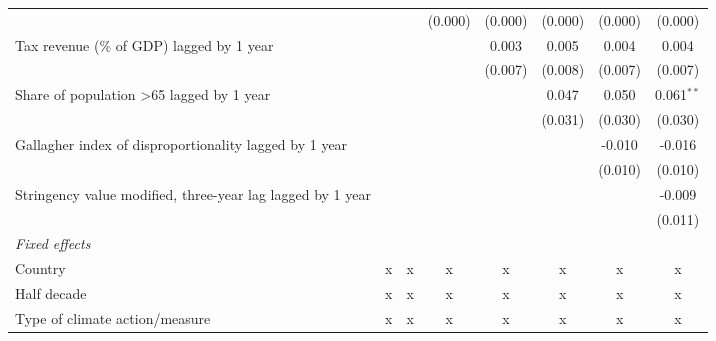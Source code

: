 \begin{tabular}{lccccccc}
                                                                            &               &               & (0.000)       & (0.000)       & (0.000)       & (0.000)       & (0.000)\\   
   Tax revenue (\% of GDP) lagged by 1 year                                 &               &               &               & 0.003         & 0.005         & 0.004         & 0.004\\   
                                                                            &               &               &               & (0.007)       & (0.008)       & (0.007)       & (0.007)\\   
   Share of population >65 lagged by 1 year                                 &               &               &               &               & 0.047         & 0.050         & 0.061$^{**}$\\   
                                                                            &               &               &               &               & (0.031)       & (0.030)       & (0.030)\\   
   Gallagher index of disproportionality lagged by 1 year                   &               &               &               &               &               & -0.010        & -0.016\\   
                                                                            &               &               &               &               &               & (0.010)       & (0.010)\\   
   Stringency value modified, three-year lag lagged by 1 year               &               &               &               &               &               &               & -0.009\\   
                                                                            &               &               &               &               &               &               & (0.011)\\   
   \emph{Fixed effects}\\
   Country                                                                  & x             & x             & x             & x             & x             & x             & x\\  
   Half decade                                                              & x             & x             & x             & x             & x             & x             & x\\  
   Type of climate action/measure                                           & x             & x             & x             & x             & x             & x             & x\\  

\end{tabular}
